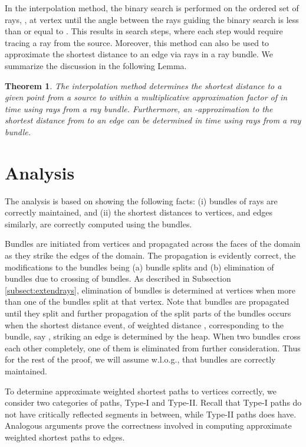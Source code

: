 \documentclass[11pt]{article}
\newtheorem{theorem}{Theorem}[section]
\begin{document}
In the interpolation method, the binary search is performed on the ordered set of rays, , at vertex  until the angle between the rays guiding the binary search is less than or equal to .
This results in  search steps, where each step would require tracing a ray from the source.
Moreover, this method can also be used to approximate the shortest distance to an edge via rays in a ray bundle.
We summarize the discussion in the following Lemma.
\begin{theorem}
\label{thm:interpol}
The interpolation method determines the shortest distance to a given point  from a source  to within a multiplicative approximation factor of  in  time using rays from a ray bundle. 
Furthermore, an -approximation to the shortest distance from  to an edge   can be determined in  time using rays from a ray bundle.
\end{theorem}

\section{Analysis}
\label{sect:analysis}

The analysis is based on showing the following facts:
(i) bundles of rays are correctly maintained, and
(ii) the shortest distances to vertices, and edges similarly, are correctly computed using the bundles. 

Bundles are initiated from vertices and propagated across the faces of the domain as they strike the 
edges of the domain. The propagation is evidently correct, the modifications to the bundles
being (a) bundle splits and (b) elimination of bundles due to crossing of bundles.
As described in Subsection \ref{subsect:extendrays}, elimination of bundles is
determined at vertices when more than one of the bundles split at that vertex.
Note that bundles are propagated until they split and further propagation of the split parts of the bundles occurs when the shortest distance event, of weighted distance , corresponding to the bundle, say ,  striking an edge is determined by the heap. 
When two bundles cross each other completely, one of them is eliminated from further consideration.
Thus for the rest of the proof, we will assume w.l.o.g., that bundles are correctly maintained.

To determine approximate weighted shortest paths to vertices correctly, we consider two categories of paths, Type-I and Type-II. 
Recall that Type-I paths do not have critically reflected segments in between, while Type-II paths does have. 
Analogous arguments prove the correctness involved in computing approximate weighted shortest paths to edges.
\end{document}
